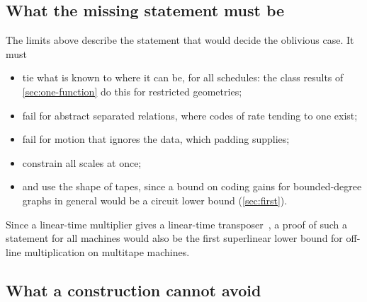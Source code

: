 \subsection{What the missing statement must be}\label{sec:missing}

The limits above describe the statement that would decide the oblivious case. It must
\begin{itemize}[leftmargin=1.5em]
\item tie what is known to where it can be, for all schedules: the class results of \cref{sec:one-function} do this
for restricted geometries;
\item fail for abstract separated relations, where codes of rate tending to one exist;
\item fail for motion that ignores the data, which padding supplies;
\item constrain all scales at once;
\item and use the shape of tapes, since a bound on coding gains for bounded-degree graphs in general would be a circuit
lower bound (\cref{sec:first}).
\end{itemize}
Since a linear-time multiplier gives a linear-time transposer~\cite{HvdH2025}, a proof of such a statement for all
machines would also be the first superlinear lower bound for off-line multiplication on multitape machines.

\subsection{What a construction cannot avoid}\label{sec:needs}

